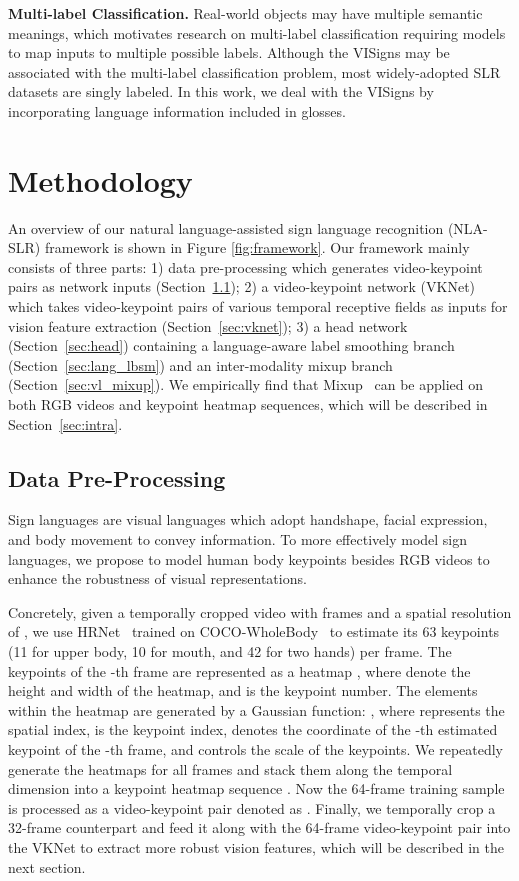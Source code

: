 \documentclass[10pt,twocolumn,letterpaper]{article}
\begin{document}
\noindent\textbf{Multi-label Classification.} Real-world objects may have multiple semantic meanings, which motivates research on multi-label classification \cite{ridnik2021asymmetric, ke2022hyperspherical, zhang2013review, rajeswar2022multi, kim2022large} requiring models to map inputs to multiple possible labels.
Although the VISigns may be associated with the multi-label classification problem, most widely-adopted SLR datasets \cite{li2020word, joze2019ms, hu2021global} are singly labeled.
In this work, we deal with the VISigns by incorporating language information included in glosses. \section{Methodology}
An overview of our natural language-assisted sign language recognition (NLA-SLR) framework is shown in Figure \ref{fig:framework}. Our framework mainly consists of three parts: 1) data pre-processing which generates video-keypoint pairs as network inputs (Section~\ref{sec:data}); 2) a video-keypoint network (VKNet) which takes video-keypoint pairs of various temporal receptive fields as inputs for vision feature extraction (Section~\ref{sec:vknet}); 3) a head network (Section~\ref{sec:head}) containing a language-aware label smoothing branch (Section~\ref{sec:lang_lbsm}) and an inter-modality mixup branch (Section~\ref{sec:vl_mixup}). We empirically find that Mixup~\cite{zhang2018mixup} can be applied on both RGB videos and keypoint heatmap sequences, which will be described in Section~\ref{sec:intra}.


\subsection{Data Pre-Processing}
\label{sec:data}
Sign languages are visual languages which adopt handshape, facial expression, and body movement to convey information.
To more effectively model sign languages, we propose to model human body keypoints besides RGB videos to enhance the robustness of visual representations. 

Concretely, given a temporally cropped video  with  frames \cite{li2020transferring} and a spatial resolution of , we use HRNet~\cite{sun2019deep} trained on COCO-WholeBody~\cite{jin2020whole} to estimate its 63 keypoints (11 for upper body, 10 for mouth, and 42 for two hands) per frame. The keypoints of the -th frame are represented as a heatmap , where  denote the height and width of the heatmap, and  is the keypoint number. The elements within the heatmap  are generated by a Gaussian function: , where  represents the spatial index,  is the keypoint index,  denotes the coordinate of the -th estimated keypoint of the -th frame, and  controls the scale of the keypoints. We repeatedly generate the heatmaps for all frames and stack them along the temporal dimension into a keypoint heatmap sequence . Now the 64-frame training sample is processed as a video-keypoint pair denoted as . Finally, we temporally crop a 32-frame counterpart  and feed it along with the 64-frame video-keypoint pair  into the VKNet to extract more robust vision features, which will be described in the next section.
\end{document}
